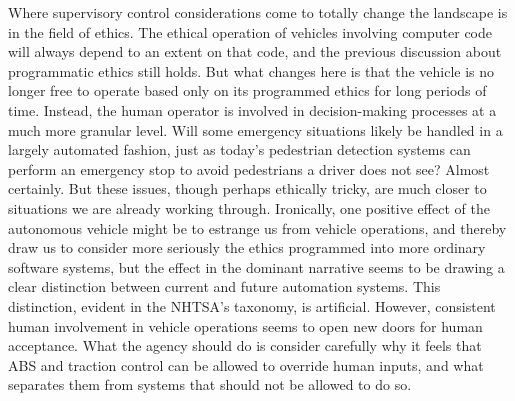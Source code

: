 Where supervisory control considerations come to totally change
the landscape is in the field of ethics. The ethical operation of
vehicles involving computer code will always depend to an extent on
that code, and the previous discussion about programmatic ethics still
holds. But what changes here is that the vehicle is no longer free to
operate based only on its programmed ethics for long periods of time.
Instead, the human operator is involved in decision-making processes
at a much more granular level. Will some emergency situations likely
be handled in a largely automated fashion, just as today's pedestrian
detection systems can perform an emergency stop to avoid pedestrians a
driver does not see? Almost certainly. But these issues, though
perhaps ethically tricky, are much closer to situations we are already
working through. Ironically, one positive effect of the autonomous vehicle
might be to estrange us from vehicle operations, and thereby draw us
to consider more seriously the ethics programmed into more ordinary software
systems, but the effect in the dominant narrative seems to be drawing a
clear distinction between current and future automation systems. This
distinction, evident in the NHTSA's taxonomy, is artificial. However, 
consistent human involvement in vehicle operations seems to open new
doors for human acceptance. What the agency should do is consider carefully why it feels that
ABS and traction control can be allowed to override human inputs, and
what separates them from systems that should not be allowed to do so.


